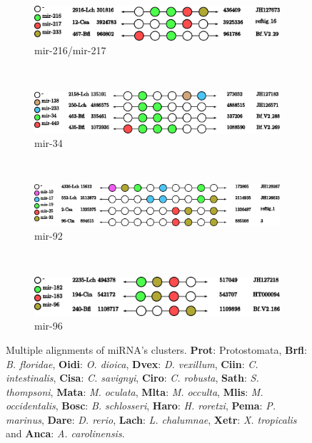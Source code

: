 \documentclass[11pt]{article}
\begin{document}
\begin{figure}[ht!]
    \\
    \begin{subfigure}[t]{0.45\textwidth}
        \centering
        \includegraphics[height=1.2 cm]{Cluster_images/mir-216_126_467}
        \caption{mir-216/mir-217}
       \end{subfigure}
     \\
    \begin{subfigure}[t]{0.45\textwidth}
        \centering
        \includegraphics[height=1.2 cm]{Cluster_images/mir-34_11A_435}
        \caption{mir-34}
       \end{subfigure}
        ~
         \begin{subfigure}[t]{0.45\textwidth}
        \centering
        \includegraphics[height=1.2 cm]{Cluster_images/mir-92_281_4336}
        \caption{mir-92}
    \end{subfigure}
    \\
    \begin{subfigure}[t]{1\textwidth}
        \centering
        \includegraphics[height=1.2 cm]{Cluster_images/mir-96_138_240}
        \caption{mir-96}
    \end{subfigure}
    \caption{Multiple alignments of miRNA's clusters. \textbf{Prot}: Protostomata, \textbf{Brfl}: \textit{B. floridae}, 
\textbf{Oidi}: \textit{O. dioica}, \textbf{Dvex}: \textit{D. vexillum}, 
\textbf{Ciin}: \textit{C. intestinalis}, \textbf{Cisa}: \textit{C. savignyi}, 
\textbf{Ciro}: \textit{C. robusta}, \textbf{Sath}: \textit{S. thompsoni}, 
\textbf{Mata}: \textit{M. oculata}, \textbf{Mlta}: \textit{M. occulta}, 
\textbf{Mlis}: \textit{M. occidentalis}, \textbf{Bosc}: \textit{B. schlosseri}, 
\textbf{Haro}: \textit{H. roretzi}, \textbf{Pema}: \textit{P. marinus}, 
\textbf{Dare}: \textit{D. rerio}, \textbf{Lach}: \textit{L. chalumnae}, 
\textbf{Xetr}: \textit{X. tropicalis} and \textbf{Anca}: \textit{A. 
carolinensis}.}
\end{figure}
\end{document}
